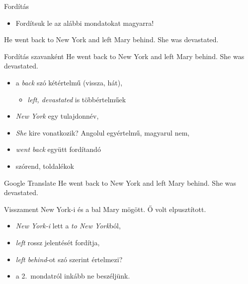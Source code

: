 \documentclass[xcolor=rgb]{beamer}
\begin{document}
\begin{frame}{Fordítás}
    \begin{itemize}
            \pause
        \item Fordítsuk le az alábbi mondatokat magyarra!
    \end{itemize}

    \begin{center}
        \Large 
    He went back to New York and left Mary behind. She was devastated.
    \end{center}
\end{frame}

\begin{frame}{Fordítás szavanként}
    He went back to New York and left Mary behind. She was devastated.

    \vspace*{.1cm}
    

    \vspace*{.1cm}
    \begin{itemize}
        \item<3->  a \emph{back} szó kétértelmű (vissza, hát), 
            \begin{itemize}
                \item<4-> \emph {left, devastated} is többértelműek
            \end{itemize}
        \item<5-> \emph{New York} egy tulajdonnév, 
        \item<6-> \emph{She} kire vonatkozik? Angolul egyértelmű, magyarul nem, 
        \item<7-> \emph{went back} együtt fordítandó
        \item<7-> szórend, toldalékok
    \end{itemize}
\end{frame}

\begin{frame}{Google Translate}
    He went back to New York and left Mary behind. She was devastated.

    \vspace*{.3cm}
    \pause
    Visszament New York-i és a bal Mary mögött. Ő volt elpusztított.

    \begin{itemize}
            \pause
        \item \emph{New York-i} lett a \emph{to New York}ból,
            \pause
        \item \emph{left} rossz jelentését fordítja,
            \pause
        \item \emph{left behind}-ot szó szerint értelmezi?
            \pause
        \item a 2.~mondatról inkább ne beszéljünk.
    \end{itemize}
\end{frame}
\end{document}
